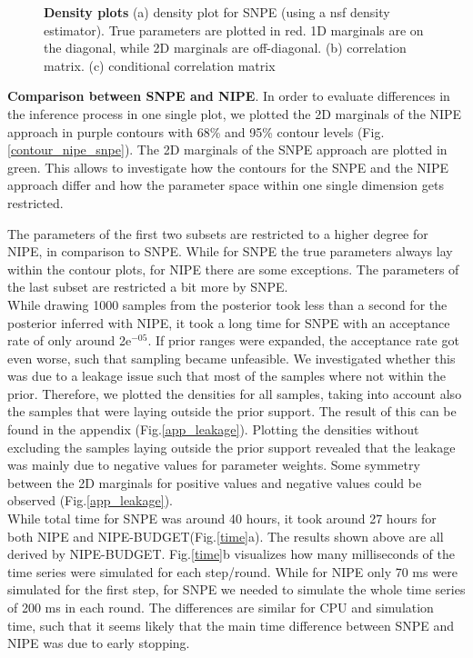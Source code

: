 \documentclass[12pt]{extreport}
\begin{document}
\begin{figure}
\caption{\label{dens17multi}\textbf{Density plots} \small (a) density plot for SNPE (using a nsf density estimator). True parameters are plotted in red. 1D marginals are on the diagonal, while 2D marginals are off-diagonal. (b) correlation matrix. (c) conditional correlation matrix }

\end{figure}

\textbf{Comparison between SNPE and NIPE}. In order to evaluate differences in the inference process in one single plot, we plotted the 2D marginals of the NIPE approach in purple contours with 68\% and 95\% contour levels (Fig.\ref{contour_nipe_snpe}). The 2D marginals of the SNPE approach are plotted in green. This allows to investigate how the contours for the SNPE and the NIPE approach differ and how the parameter space within one single dimension gets restricted.  

The parameters of the first two subsets are restricted to a higher degree for NIPE, in comparison to SNPE. While for SNPE the true parameters always lay within the contour plots, for NIPE there are some exceptions. The parameters of the last subset are restricted a bit more by SNPE. \\

While drawing 1000 samples from the posterior took less than a second for the posterior inferred with NIPE, it took a long time for SNPE with an acceptance rate of only around 2e$^{-05}$. If prior ranges were expanded, the acceptance rate got even worse, such that sampling became unfeasible. We investigated whether this was due to a leakage issue such that most of the samples where not within the prior. Therefore, we plotted the densities for all samples, taking into account also the samples that were laying outside the prior support. The result of this can be found in the appendix (Fig.\ref{app_leakage}). Plotting the densities without excluding the samples laying outside the prior support revealed that the leakage was mainly due to negative values for parameter weights. Some symmetry between the 2D marginals for positive values and negative values could be observed (Fig.\ref{app_leakage}). \\

While total time for SNPE was around 40 hours, it took around 27 hours for both NIPE and NIPE-BUDGET(Fig.\ref{time}a). The results shown above are all derived by NIPE-BUDGET.
Fig.\ref{time}b visualizes how many milliseconds of the time series were simulated for each step/round. While for NIPE only 70 ms were simulated for the first step, for SNPE we needed to simulate the whole time series of 200 ms in each round. The differences are similar for CPU and simulation time, such that it seems likely that the main time difference between SNPE and NIPE was due to early stopping.\\
\end{document}
